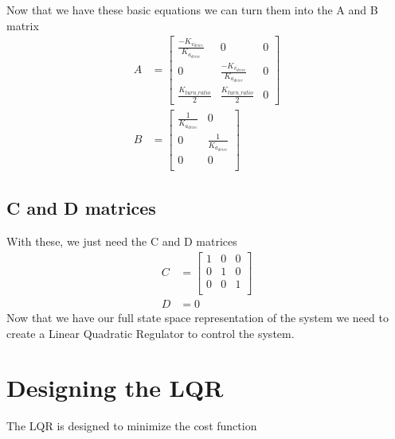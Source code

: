 \documentclass{scrartcl}
\begin{document}
Now that we have these basic equations we can turn them into the A and B matrix
\begin{align}
    A & =
    \begin{bmatrix}
        \frac{-K_{v_\mathit{drive}}}{K_{a_\mathit{drive}}} & 0                                                  & 0 \\
        0                                                  & \frac{-K_{v_\mathit{drive}}}{K_{a_\mathit{drive}}} & 0 \\
        \frac{K_\mathit{turn\_ratio}}{2}                   & \frac{K_\mathit{turn\_ratio}}{2}                   & 0
    \end{bmatrix} \\
    B & =
    \begin{bmatrix}
        \frac{1}{K_{a_\mathit{drive}}} & 0                              \\
        0                              & \frac{1}{K_{a_\mathit{drive}}} \\
        0                              & 0                              \\
    \end{bmatrix}
\end{align}

\subsection{C and D matrices}
With these, we just need the C and D matrices
\begin{align}
    C & =
    \begin{bmatrix}
        1 & 0 & 0 \\
        0 & 1 & 0 \\
        0 & 0 & 1 \\
    \end{bmatrix} \\
    D & = 0
\end{align}
Now that we have our full state space representation of the system we need to create a Linear Quadratic Regulator to control the system.

\section{Designing the LQR}
The LQR is designed to minimize the cost function
\end{document}
